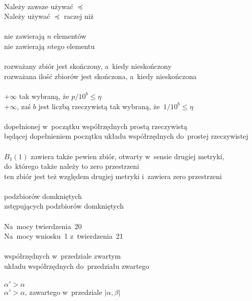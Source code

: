 \documentclass[a4paper,11pt]{article}
\begin{document}
\noi
{} \\
\Jest Należy zawsze używać $\preceq$ \\
\Powin  Należy używać $\preceq$ raczej niż \\
 \\
\Jest nie zawierają $n$ elementów \\
\Powin  nie zawierają $n$\dywiz tego elementu \\
 \\
\Jest rozważany zbiór jest skończony, a~kiedy nieskończony \\
\Powin  rozważana ilość zbiorów jest skończona, a~kiedy nieskończona \\
 \\
\Jest $+\infty$ tak wybraną, że $p / 10^{ b } \leq \eta$ \\
$+\infty$, zaś $b$ jest liczbą rzeczywistą tak wybraną,
że~$1 / 10^{ b } \leq \eta$ \\
 \\
\Jest dopełnionej w~początku współrzędnych prostą rzeczywistą \\
\Powin będącej dopełnieniem początku układu współrzędnych do~prostej
rzeczywistej \\
 \\
\Jest $B_{ 1 }( 1 )$ zawiera także pewien zbiór, otwarty w~sensie
drugiej
metryki, do~którego także należy to zero przestrzeni \\
\Powin ten zbiór jest też względem drugiej metryki i~zawiera zero
przestrzeni \\ %
 \\
\Jest podzbiorów domkniętych \\
\Powin  zstępujących podzbiorów domkniętych \\
 \\
\Jest Na~mocy twierdzenia~20 \\
\Powin  Na~mocy wniosku~1 z~twierdzenia~21 \\
 \\
\Jest współrzędnych w~przedziale zwartym \\
\Powin  układu współrzędnych do~przedziału zwartego \\
 \\
\Jest $\alpha' > \alpha$ \\
\Powin  $\alpha' > \alpha$, zawartego w~przedziale $| \alpha, \beta |$ \\
\end{document}
